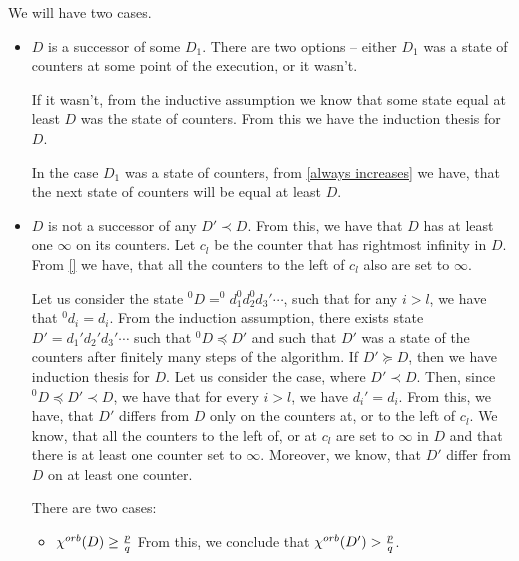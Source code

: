We will have two cases. 
\begin{itemize}
\item $D$ is a successor of some $D_1$. 
There are two options -- either $D_1$ was a state of counters 
at some point of the execution, or it wasn't. 

If it wasn't, from the inductive assumption we know 
that some state equal at least $D$ was the state of counters. From this we have the induction 
thesis for $D$.

In the case $D_1$ was a state of counters, from \ref{always increases} we have, that the next 
state of counters will be equal at least $D$.  




% 


\item $D$ is not a successor of any $D' \prec D$. From this, we have that $D$ has at least one 
$\infty$ on its counters.  
Let $c_l$ be the counter that has rightmost infinity in $D$. 
From \ref{} we have, that all the counters to the left of $c_l$ also are set to $\infty$.

Let us consider the state $^0D = ^0d_1^0d_2^0d_3'\cdots$, such that for any $i > l$, we have that 
$^0d_i = d_i$. From the induction assumption, there exists state $D' = d_1'd_2'd_3'\cdots$ 
such that $^0D\preceq D'$ and such that $D'$ was a state of the counters after finitely 
many steps of the algorithm. If $D' \succeq D$, then we have induction thesis for $D$. 
Let us consider the case, where $D' \prec D$. Then, since $^0D \preceq D' \prec D$, we have 
that for every $i > l$, we have $d_i' = d_i$. From this, we have, that $D'$ differs from 
$D$ only on the counters at, or to the left of $c_l$. We know, that all the counters 
to the left of, or at $c_l$
are set to $\infty$ in $D$ and that there is at least one counter set to $\infty$. 
Moreover, we know, that $D'$ differ from $D$ on at least one counter.

There are two cases:
\begin{itemize}
\item ${\chi^{orb}(D)} \geq \frac{p}{q}$ 
From this, we conclude 
that ${\chi^{orb}(D')} > \frac{p}{q}$. 


\end{itemize}
\end{itemize}
